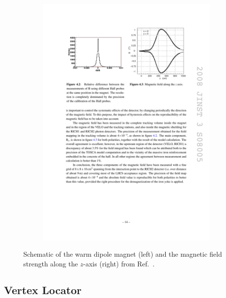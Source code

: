 \begin{figure}[!h]
\begin{subfigure}[t]{0.4\textwidth}
        \includegraphics[width=1.0\textwidth]{figs/Detector/magnet_B_field.pdf}
    \end{subfigure}
    \caption{Schematic of the \lhcb warm dipole magnet (left) and the magnetic field strength along the $z$-axis (right) from Ref.~\cite{Alves:2008zz}.}
    \label{fig:Dec_magnet}   
\end{figure}


\subsection{Vertex Locator}

